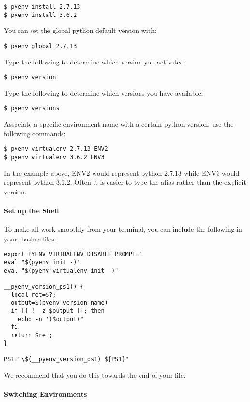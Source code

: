 \begin{verbatim}
$ pyenv install 2.7.13
$ pyenv install 3.6.2
\end{verbatim}

You can set the global python default version with:

\begin{verbatim}
$ pyenv global 2.7.13
\end{verbatim}

Type the following to determine which version you activated:

\begin{verbatim}
$ pyenv version
\end{verbatim}

Type the following to determine which versions you have available:

\begin{verbatim}
$ pyenv versions
\end{verbatim}

Associate a specific environment name with a certain python version, use
the following commands:

\begin{verbatim}
$ pyenv virtualenv 2.7.13 ENV2
$ pyenv virtualenv 3.6.2 ENV3
\end{verbatim}

In the example above, ENV2 would represent python 2.7.13 while ENV3
would represent python 3.6.2. Often it is easier to type the alias
rather than the explicit version.

\paragraph{Set up the Shell}\label{set-up-the-shell}

To make all work smoothly from your terminal, you can include the
following in your .bashrc files:

\begin{verbatim}
export PYENV_VIRTUALENV_DISABLE_PROMPT=1
eval "$(pyenv init -)"
eval "$(pyenv virtualenv-init -)"

__pyenv_version_ps1() {
  local ret=$?;
  output=$(pyenv version-name)
  if [[ ! -z $output ]]; then
    echo -n "($output)"
  fi
  return $ret;
}

PS1="\$(__pyenv_version_ps1) ${PS1}"
\end{verbatim}

We recommend that you do this towards the end of your file.

\paragraph{Switching Environments}\label{switching-environments}

